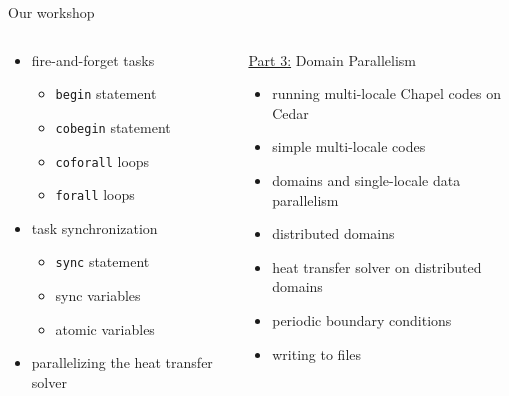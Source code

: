 \documentclass[10pt,xcolor=pdftex,dvipsnames,table]{beamer}
\newcommand{\tc}{\textcolor}
\begin{document}
\begin{frame}{Our workshop}
\begin{columns}[]
\begin{block}{}
{\begin{itemize}
{\begin{itemize}
            \item concurrency vs. true parallelism
            \item concurrency vs. task locality
          \end{itemize}}
        \item fire-and-forget tasks
          {\let\small\scriptsize \small
            \begin{itemize}\setlength{\itemsep}{0.5mm}
            \item \tc{Mahogany}{\texttt{begin}} statement
            \item \tc{Mahogany}{\texttt{cobegin}} statement
            \item \tc{Mahogany}{\texttt{coforall}} loops
            \item \tc{Mahogany}{\texttt{forall}} loops
          \end{itemize}}
        \item task synchronization
          {\let\small\scriptsize \small
            \begin{itemize}\setlength{\itemsep}{0.5mm}
            \item \tc{Mahogany}{\texttt{sync}} statement
            \item sync variables
            \item atomic variables
          \end{itemize}}
        \item parallelizing the heat transfer solver
      \end{itemize}}
    \end{block}
    \begin{block}{}
      \begin{center}
        {\sc \underline{Part 3:} Domain Parallelism}
      \end{center}
      \vspace{-2mm}
      {\let\normalsize\footnotesize \normalsize
        \begin{itemize}\setlength{\itemsep}{1mm}
        \item running multi-locale Chapel codes on Cedar
        \item simple multi-locale codes
        \item domains and single-locale data parallelism
        \item distributed domains
        \item heat transfer solver on distributed domains
        \item periodic boundary conditions
        \item writing to files
      \end{itemize}}
    \end{block}
  \end{columns}
\end{frame}
\end{document}
